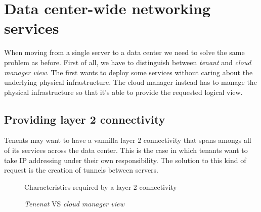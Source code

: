 \section{Data center-wide networking services}
When moving from a single server to a data center we need to solve the same
problem as before. First of all, we have to distinguish between \emph{tenant}
and \emph{cloud manager view}. The first wants to deploy some services without
caring about the underlying physical infrastructure. The cloud manager instead
has to manage the physical infrastructure so that it's able to provide the
requested logical view.

\subsection{Providing layer 2 connectivity}
Tenents may want to have a vannilla layer 2 connectivity that spans amongs all of
its services across the data center. This is the case in which tenants want to
take IP addressing under their own responsibility. The solution to this kind of
request is the creation of tunnels between servers.

\newpage
\begin{figure}[ht!]
    \centering
    \caption{Characteristics required by a layer 2 connectivity}
\end{figure}

\begin{figure}[h!]
    \centering
    \hspace{1.5cm}
    \caption{\emph{Tenenat} VS \emph{cloud manager view}}
\end{figure}

